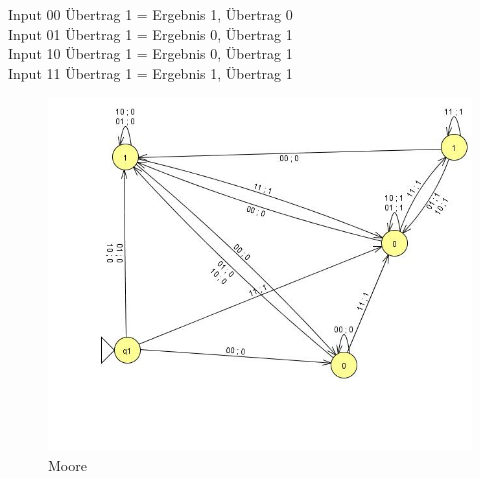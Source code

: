 \documentclass[12pt,twoside,a4paper]{article}
\begin{document}
Input 00 Übertrag 1 = Ergebnis 1, Übertrag 0 \\
Input 01 Übertrag 1 = Ergebnis 0, Übertrag 1 \\
Input 10 Übertrag 1 = Ergebnis 0, Übertrag 1 \\
Input 11 Übertrag 1 = Ergebnis 1, Übertrag 1 \\

\begin{figure}[!htb]
\centering
\includegraphics[width=180mm]{33moore.jpg}
\caption{Moore \label{overflow}}
\end{figure}
\end{document}
